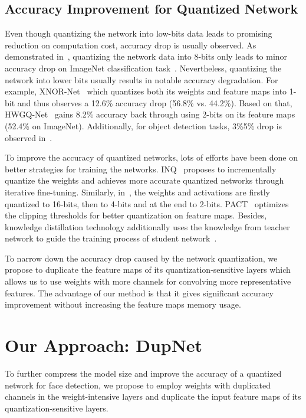 \documentclass[10pt,twocolumn,letterpaper]{article}
\begin{document}
\subsection{Accuracy Improvement for Quantized Network}

Even though quantizing the network into low-bits data leads to promising reduction on computation cost, accuracy drop is usually observed. As demonstrated in~\cite{Google8bit,NvidiaInt8}, quantizing the network data into 8-bits  only leads to minor accuracy drop on ImageNet classification task~\cite{ImageNet}. Nevertheless, quantizing the network into lower bits usually results in notable accuracy degradation.  For example, XNOR-Net~\cite{XNOR} which quantizes both its weights and feature maps into 1-bit and thus observes a 12.6\% accuracy drop (56.8\% vs. 44.2\%). Based on that, HWGQ-Net~\cite{HWGQ} gains 8.2\% accuracy back through using 2-bits on its feature maps (52.4\% on ImageNet). Additionally, for object detection tasks, 3\%5\% drop is observed in~\cite{SQuantizer}.

To improve the accuracy of quantized networks, lots of efforts have been done on better strategies for training the networks. INQ~\cite{INQ} proposes to incrementally quantize the weights and achieves more accurate quantized networks through iterative fine-tuning. Similarly, in~\cite{PQ}, the weights and activations are firstly quantized to 16-bits, then to 4-bits and at the end to 2-bits. PACT~\cite{PACT} optimizes the clipping thresholds for better quantization on feature maps. Besides, knowledge distillation technology additionally uses the knowledge from teacher network to guide the training process of student network~\cite{QunatMimic}. 

To narrow down the accuracy drop caused by the network quantization, we propose to duplicate the feature maps of its quantization-sensitive layers  which allows us to use weights with more channels for convolving more representative features. The advantage of our method is that it gives significant accuracy improvement without increasing the feature maps memory usage.

\section{Our Approach: DupNet}\label{Sec:hwgq}
To further compress the model size and improve the accuracy of a quantized network for face detection, we propose to employ weights with duplicated channels in the weight-intensive layers and duplicate the input feature maps of its quantization-sensitive layers. 
\end{document}
